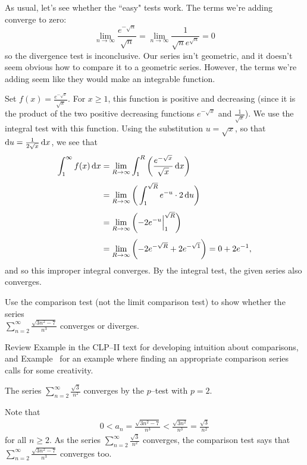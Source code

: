 \begin{solution}
As usual, let's see whether the ``easy" tests work. The terms we're adding converge to zero:
\[\lim_{n \to \infty}\frac{e^{-\sqrt{n}}}{\sqrt{n}}=\lim_{n \to \infty}\frac{1}{\sqrt{n}e^{\sqrt{n}}}=0 \]
so the divergence test is inconclusive. Our series isn't geometric, and it doesn't seem obvious how to compare it to a geometric series. However, the terms we're adding seem like they would make an integrable function.

Set $f(x)=\frac{e^{-\sqrt{x}}}{\sqrt{x}}$. For $x\ge1$,
this function is positive and decreasing (since it is the product of
the two positive decreasing functions $e^{-\sqrt x}$ and $\frac1{\sqrt x}$).
We use the integral test with this function.
Using the substitution $u=\sqrt x$, so that
$\mathrm{d}u = \frac1{2\sqrt x}\,\mathrm{d}x$, we see that
\begin{align*}
\int_1^\infty f(x)\,\mathrm{d}x
&=\lim_{R\rightarrow\infty}\int_1^R \bigg( \frac{e^{-\sqrt{x}}}{\sqrt{x}}\,\mathrm{d}x \bigg) \\[0.05in]
&=\lim_{R\rightarrow\infty} \bigg( \int_1^{\sqrt{R}} e^{-u}\cdot2\,\mathrm{d}u \bigg) \\[0.05in]
&=\lim_{R\rightarrow\infty} \bigg( {-}2e^{-u}\Big|_1^{\sqrt{R}} \bigg) \\[0.05in]
&=\lim_{R\rightarrow\infty} \bigg( {-}2e^{-\sqrt R} + 2e^{-\sqrt1} \bigg)
= 0 + 2e^{-1},
\end{align*}
and so this improper integral converges. By the integral test,
the given series also converges.
\end{solution}


\begin{question}[2016Q6]
Use the comparison test (not the limit comparison test) to show whether the series \\
$\displaystyle \sum_{n=2}^{\infty} \frac{\sqrt{3 n^2 - 7}}{n^{3}}$ converges or diverges.
\end{question}

\begin{hint}
Review Example  in the
CLP--II text for developing intuition about comparisons, and Example~ for an example where finding an appropriate comparison series calls for some creativity.
\end{hint}

\begin{answer}
The series $\displaystyle \sum_{n=2}^{\infty} \frac{\sqrt{3}}{n^2}$
converges by the $p$--test with $p=2$.

Note that
\begin{align*}
 0< a_n = \frac{\sqrt{3 n^2 - 7}}{n^3} < \frac{\sqrt{3n^2}}{n^3} = \frac{\sqrt{3}}{n^2}
\end{align*}
for all $n\ge 2$. As the series $\sum\limits_{n=2}^\infty \frac{\sqrt3}{n^2}$ converges,
 the comparison test says that $\sum\limits_{n=2}^\infty  \frac{\sqrt{3 n^2 - 7}}{n^{3}}$ converges too.
\end{answer}

